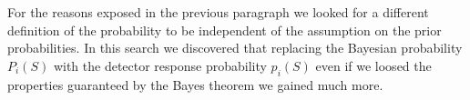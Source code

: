 For the reasons exposed in the previous paragraph we looked for a different definition of the probability to be independent of the assumption on the prior probabilities. In this search we discovered that replacing the Bayesian probability $P_{i}(S)$ with the detector response probability $p_{i}(S)$ even if we loosed the properties guaranteed by the Bayes theorem we gained much more.

